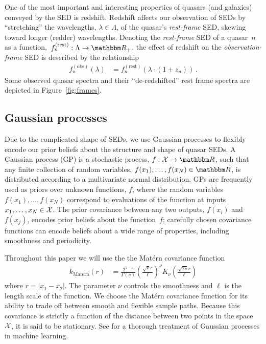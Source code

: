 \documentclass{article} %
\begin{document}
One of the most important and interesting properties of quasars (and galaxies) conveyed by the SED is redshift. 
Redshift affects our observation of SEDs by ``stretching'' the wavelengths, ${\lambda \in \Lambda}$, of the quasar's \emph{rest-frame} SED, skewing toward longer (redder) wavelengths.
Denoting the \emph{rest-frame} SED of a quasar~$n$ as a function,~${f_n^{(\text{rest})} : \Lambda \rightarrow \R_+}$, the effect of redshift on the \emph{observation-frame} SED is described by the relationship 
\begin{align}
  f_n^{(\text{obs})}(\lambda) &= f_n^{(\text{rest})}(\lambda \cdot (1 + z_n)) \, .
\end{align}
Some observed quasar spectra and their ``de-redshifted'' rest frame spectra are depicted in Figure~\ref{fig:frames}.

\subsection{Gaussian processes}
Due to the complicated shape of SEDs, we use Gaussian processes to flexibly encode our prior beliefs about the structure and shape of quasar SEDs. 
A Gaussian process (GP) is a stochastic process, ${f: \mathcal{X} \rightarrow \R}$, such that any finite collection of random variables, ${f(x_1),\dots, f(x_N) \in \R}$, is distributed according to a multivariate normal distribution.  
GPs are frequently used as priors over unknown functions, $f$, where the random variables $f(x_1), \dots, f(x_N)$ correspond to evaluations of the function at inputs ${x_1, \dots, x_N \in \mathcal{X}}$.  
The prior covariance between any two outputs, $f(x_i)$ and $f(x_j)$, encodes prior beliefs about the function~$f$; carefully chosen covariance functions can encode beliefs about a wide range of properties, including smoothness and periodicity.  

Throughout this paper we will use the the Mat\'{e}rn \cite{Matern1986spatial} covariance function
\begin{align}
  k_{\text{Matern}}(r)
    &= \frac{2^{1-\nu}}{\Gamma(\nu)} 
       \left( \frac{\sqrt{\nu} r}{\ell} \right) ^\nu
       K_\nu\left( \frac{\sqrt{2\nu} r}{\ell}\right)
\end{align}
where ${r = |x_1 - x_2|}$.  The parameter $\nu$ controls the smoothness and $\ell$ is the length scale of the function.  
We choose the Mat\'{e}rn covariance function for its ability to trade off between smooth and flexible sample paths.  
Because this covariance is strictly a function of the distance between two points in the space $\mathcal{X}$, it is said to be stationary. 
See \citet{rasmussen2006gaussian} for a thorough treatment of Gaussian processes in machine learning. 
\end{document}
